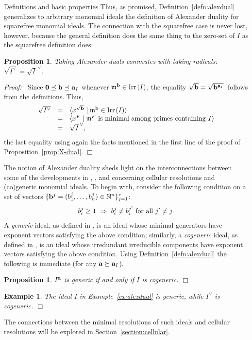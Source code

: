\documentclass[12pt,leqno]{article}
\newtheorem{prop}[thm]{Proposition}
\newtheorem{example}[thm]{Example}
\def\<{{\langle}}
\def\>{{\rangle}}
\def\Irr{{\rm Irr}{\scriptscriptstyle \,}}
\def\aa{{{\rm \bf a}}}
\def\bb{{{\rm \bf b}}}
\def\mm{{\mathfrak m}}
\def\NN{{\mathbb N}}
\begin{document}
\begin{section}{Definitions and basic properties}
Thus, as promised, Definition~\ref{defn:alexdual} generalizes to
arbitrary monomial ideals the definition of Alexander duality for
squarefree monomial ideals.  The connection with the squarefree case is
never lost, however, because the general definition does the same thing
to the zero-set of $I$ as the squarefree definition does:
\begin{prop}
Taking Alexander duals commutes with taking radicals: $\sqrt{I^\vee} =
\sqrt{I}^{\,\vee}$.
\end{prop}
{\it Proof:\ } Since ${\bf 0} \preceq \bb \preceq \aa_I$ whenever
$\mm^\bb \in \Irr(I)$, the equality $\sqrt{\bb} = \sqrt{\bb^{\aa_I}}\,$
follows from the definitions.  Thus,
$$
\begin{array}{rcl}
\sqrt{I^\vee} &
	= &
	\<x^{\sqrt \bb} \mid \mm^\bb \in \Irr(I)\> \cr
& = &	\<x^F \mid \mm^F {\rm \ is\ minimal\ among\ primes\ containing\ }
	I\>\cr
& = &	\sqrt{I}^{\,\vee}, \cr
\end{array}
$$
the last equality using again the facts mentioned in the first line of
the proof of Proposition~\ref{prop:X-dual}.
%
\hfill
$\Box$
\vskip 2mm

The notion of Alexander duality sheds light on the interconnections
between some of the developments in \cite{BPS}, \cite{BS}, and \cite{Stu}
concerning cellular resolutions and (co)generic monomial ideals.  To
begin with, consider the following condition on a set of vectors $\{\bb^j
= (b^j_1,\ldots,b^j_n) \in \NN^n\}_{j=1}^r$:
$$
b_i^j \geq 1\ \Rightarrow\ b^j_i \neq b^{j'}_i\ {\rm for\ all\ } j' \neq j.
$$
A \emph{generic} ideal, as defined in \cite{BPS}, is an ideal whose
minimal generators have exponent vectors satisfying the above condition;
similarly, a \emph{cogeneric} ideal, as defined in \cite{Stu}, is an
ideal whose irredundant irreducible components have exponent vectors
satisfying the above condition.  Using Definition~\ref{defn:alexdual} the
following is immediate (for any $\aa \succeq \aa_I$).
\begin{prop} \label{prop:gen-cogen}
$I^\aa$ is generic if and only if $I$ is cogeneric.
%
\hfill
$\Box$
\end{prop}
\begin{example}\rm
The ideal $I$ in Example~\ref{ex:alexdual} is generic, while $I^\vee$ is
cogeneric.
%
\hfill
$\Box$
\end{example}
The connections between the minimal resolutions of such ideals and
cellular resolutions will be explored in Section~\ref{section:cellular}.


\end{section}
\end{document}

